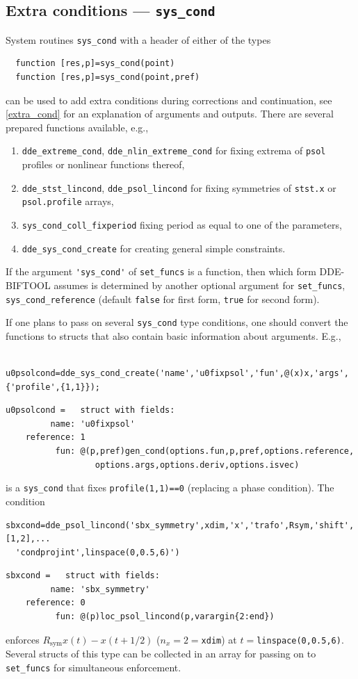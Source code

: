 \documentclass[10pt]{scrartcl}
\newcommand{\DDEBIFCODE}{\textsc{DDE-BIFTOOL}}
\newcommand{\blist}[1]{\mbox{\lstinline!#1!}}
\begin{document}
\subsection{Extra conditions --- \texorpdfstring{\blist{sys_cond}}{sys\_cond}}\label{sec:syscond}
System routines \blist{sys_cond} with a header of either of the types
\begin{lstlisting}
  function [res,p]=sys_cond(point)
  function [res,p]=sys_cond(point,pref)
\end{lstlisting}
can be used to add extra conditions during corrections and
continuation, see \cref{extra_cond} for an explanation of
arguments and outputs. There  are several prepared functions available, e.g.,
\begin{enumerate}
\item \blist{dde_extreme_cond}, \blist{dde_nlin_extreme_cond} for
  fixing extrema of \blist{psol} profiles or nonlinear functions
  thereof, 
\item \blist{dde_stst_lincond}, \blist{dde_psol_lincond} for
  fixing symmetries of \blist{stst.x} or \blist{psol.profile} arrays,
\item \blist{sys_cond_coll_fixperiod} fixing period as equal to one of the parameters,
\item \blist{dde_sys_cond_create} for creating general simple constraints.
\end{enumerate}
If the argument \blist{'sys_cond'} of \blist{set_funcs} is a function,
then which form \DDEBIFCODE{} assumes is determined by another
optional argument for \blist{set_funcs}, \blist{sys_cond_reference}
(default \blist{false} for first form, \blist{true} for second form).

If one plans to pass on several \blist{sys_cond} type conditions, one should convert the functions to structs that also contain basic information about arguments. E.g.,
\begin{lstlisting}
  u0psolcond=dde_sys_cond_create('name','u0fixpsol','fun',@(x)x,'args',{'profile',{1,1}});    
\end{lstlisting}
\begin{verbatim}
u0psolcond =   struct with fields:
         name: 'u0fixpsol'
    reference: 1
          fun: @(p,pref)gen_cond(options.fun,p,pref,options.reference,
                  options.args,options.deriv,options.isvec)
\end{verbatim}
is a \blist{sys_cond} that fixes \blist{profile(1,1)==0} (replacing a
phase condition). The condition
\begin{lstlisting}
sbxcond=dde_psol_lincond('sbx_symmetry',xdim,'x','trafo',Rsym,'shift',[1,2],...
  'condprojint',linspace(0,0.5,6)')
\end{lstlisting}
\begin{verbatim}
sbxcond =   struct with fields:
         name: 'sbx_symmetry'
    reference: 0
          fun: @(p)loc_psol_lincond(p,varargin{2:end}) 
\end{verbatim}
enforces $R_\mathrm{sym}x(t)-x(t+1/2)$ ($n_x=2=$\blist{xdim}) at $t=$\blist{linspace(0,0.5,6)}.
Several structs of this type can be collected in an array for passing on to \blist{set_funcs} for simultaneous enforcement.
  
\end{document}
